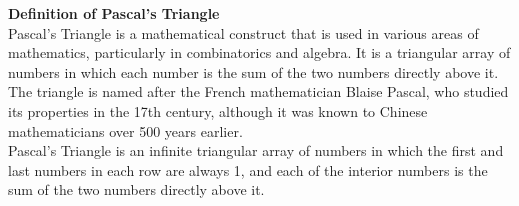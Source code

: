 \newlength{\R}
\setlength{\R}{.75cm}
\newcommand\mycolor{white}

\newcommand{\modulo}[2]{%
  \FPeval{\result}{trunc(#1-(#2*trunc(#1/#2,0)),0)}\result%
}


\newcommand{\makesierp}[2][2]{%
    \begin{tikzpicture}[line width=.8pt]
        \foreach \k in {0,...,#2}{
            \begin{scope}[shift={(-60:{sqrt(3)*\R*\k})}]
                \pgfmathtruncatemacro\ystart{#2-\k}
                \foreach \n in {0,...,\ystart}{
                    \pgfmathtruncatemacro\newn{\n+\k}
                    \pgfmathsetmacro{\myvalue}{1}
                    \ifnum\k>0
                        \foreach \b in {1,...,\k}{
                            \FPeval\myvalue{trunc(\myvalue*(\newn-\b+1)/\b:0)}
                            \global\let\myvalue=\myvalue
                        }
                    \fi
                    \modulo{\myvalue}{#1}%
                    \ifnum\result=0 \def\mycolor{green}\fi%
                    \begin{scope}[shift={(-120:{sqrt(3)*\R*\n})}]
                        \draw[fill=\mycolor!20] 
                        (30:\R) \foreach \x in {90,150,...,330} {
                        -- (\x:\R)}
                        --cycle (90:0)node[font=\tiny] {$\mathbf{\myvalue}$};
                    \end{scope}
                }
            \end{scope}
        }
    \end{tikzpicture}
}

\textbf{Definition of Pascal's Triangle} \\
Pascal's Triangle is a mathematical construct that is used in various areas of mathematics, particularly in combinatorics and algebra. It is a triangular array of numbers in which each number is the sum of the two numbers directly above it. The triangle is named after the French mathematician Blaise Pascal, who studied its properties in the 17th century, although it was known to Chinese mathematicians over 500 years earlier.  \\

Pascal's Triangle is an infinite triangular array of numbers in which the first and last numbers in each row are always 1, and each of the interior numbers is the sum of the two numbers directly above it.  \\

